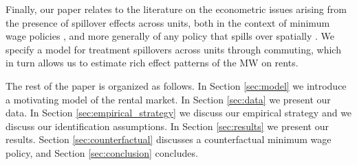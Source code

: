 Finally, our paper relates to the literature on the econometric issues arising 
from the presence of spillover effects across units,
both in the context of minimum wage policies \parencite{Kuehn2016, Huang2020}, 
and more generally of any policy that spills over spatially
\parencite{DelgadoFlorax2015, Butts2021}.
We specify a model for treatment spillovers across units through commuting, 
which in turn allows us to estimate rich effect patterns of the MW on rents.

The rest of the paper is organized as follows.
In Section \ref{sec:model} we introduce a motivating model of the rental market.
In Section \ref{sec:data} we present our data.
In Section \ref{sec:empirical_strategy} we discuss our empirical strategy and
we discuss our identification assumptions.
In Section \ref{sec:results} we present our results.
Section \ref{sec:counterfactual} discusses a counterfactual minimum wage policy, and
Section \ref{sec:conclusion} concludes.

